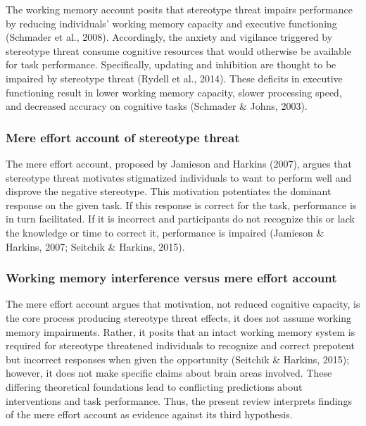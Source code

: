 \documentclass[
  stu, a4paper,floatsintext]{apa7}
\begin{document}
The working memory account posits that stereotype threat impairs performance by reducing individuals' working memory capacity and executive functioning (Schmader et al., 2008).
Accordingly, the anxiety and vigilance triggered by stereotype threat consume cognitive resources that would otherwise be available for task performance.
Specifically, updating and inhibition are thought to be impaired by stereotype threat (Rydell et al., 2014).
These deficits in executive functioning result in lower working memory capacity, slower processing speed, and decreased accuracy on cognitive tasks (Schmader \& Johns, 2003).

\subsubsection{Mere effort account of stereotype threat}\label{mere-effort-account-of-stereotype-threat}

The mere effort account, proposed by Jamieson and Harkins (2007), argues that stereotype threat motivates stigmatized individuals to want to perform well and disprove the negative stereotype.
This motivation potentiates the dominant response on the given task.
If this response is correct for the task, performance is in turn facilitated. If it is incorrect and participants do not recognize this or lack the knowledge or time to correct it, performance is impaired (Jamieson \& Harkins, 2007; Seitchik \& Harkins, 2015).

\subsubsection{Working memory interference versus mere effort account}\label{working-memory-interference-versus-mere-effort-account}

The mere effort account argues that motivation, not reduced cognitive capacity, is the core process producing stereotype threat effects, it does not assume working memory impairments.
Rather, it posits that an intact working memory system is required for stereotype threatened individuals to recognize and correct prepotent but incorrect responses when given the opportunity (Seitchik \& Harkins, 2015); however, it does not make specific claims about brain areas involved.
These differing theoretical foundations lead to conflicting predictions about interventions and task performance.
Thus, the present review interprets findings of the mere effort account as evidence against its third hypothesis.
\end{document}

